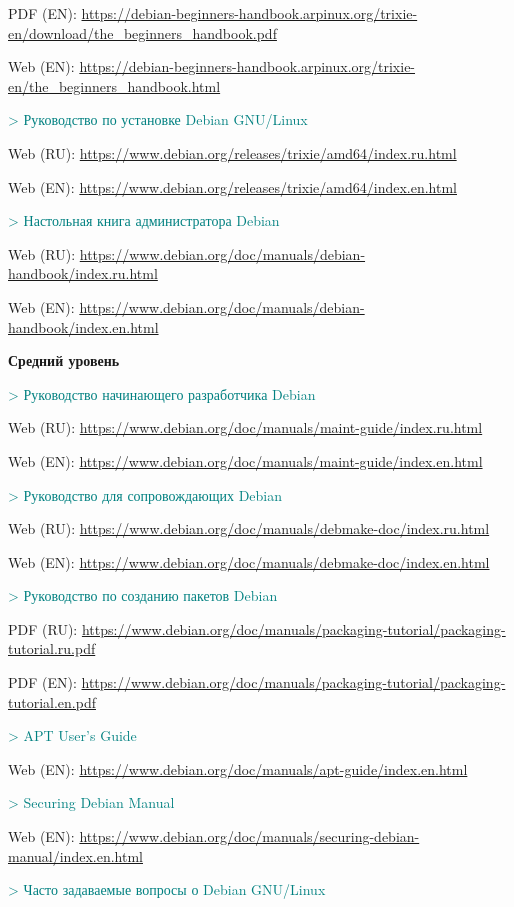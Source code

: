 PDF (EN): \url{https://debian-beginners-handbook.arpinux.org/trixie-en/download/the_beginners_handbook.pdf}

Web (EN): \url{https://debian-beginners-handbook.arpinux.org/trixie-en/the_beginners_handbook.html}

\textcolor{teal}{> Руководство по установке Debian GNU/Linux}

Web (RU): \url{https://www.debian.org/releases/trixie/amd64/index.ru.html}

Web (EN): \url{https://www.debian.org/releases/trixie/amd64/index.en.html}

\textcolor{teal}{> Настольная книга администратора Debian}

Web (RU): \url{https://www.debian.org/doc/manuals/debian-handbook/index.ru.html}

Web (EN): \url{https://www.debian.org/doc/manuals/debian-handbook/index.en.html}

\textbf{Средний уровень}

\textcolor{teal}{> Руководство начинающего разработчика Debian}

Web (RU): \url{https://www.debian.org/doc/manuals/maint-guide/index.ru.html}

Web (EN): \url{https://www.debian.org/doc/manuals/maint-guide/index.en.html}

\textcolor{teal}{> Руководство для сопровождающих Debian}

Web (RU): \url{https://www.debian.org/doc/manuals/debmake-doc/index.ru.html}

Web (EN): \url{https://www.debian.org/doc/manuals/debmake-doc/index.en.html}

\textcolor{teal}{> Руководство по созданию пакетов Debian}

PDF (RU): \url{https://www.debian.org/doc/manuals/packaging-tutorial/packaging-tutorial.ru.pdf}

PDF (EN): \url{https://www.debian.org/doc/manuals/packaging-tutorial/packaging-tutorial.en.pdf}

\vspace{10cm}

\textcolor{teal}{> APT User's Guide}

Web (EN): \url{https://www.debian.org/doc/manuals/apt-guide/index.en.html}

\textcolor{teal}{> Securing Debian Manual}

Web (EN): \url{https://www.debian.org/doc/manuals/securing-debian-manual/index.en.html}

\textcolor{teal}{> Часто задаваемые вопросы о Debian GNU/Linux}

